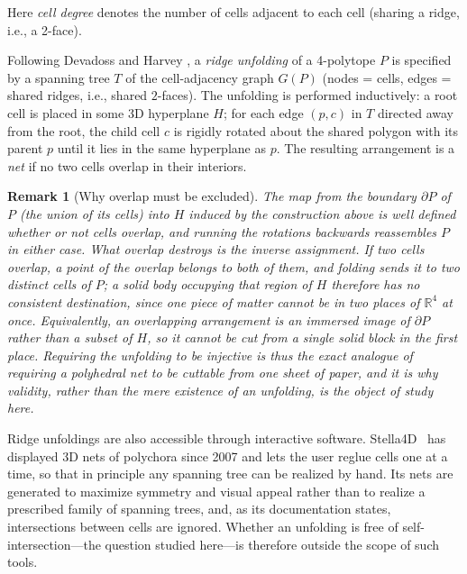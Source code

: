 \documentclass[11pt,letterpaper]{article}
\newtheorem{remark}{Remark}
\newcommand{\RR}{\mathbb{R}}
\begin{document}
\noindent
Here \emph{cell degree} denotes the number of cells adjacent to each
cell (sharing a ridge, i.e., a 2-face).


Following Devadoss and Harvey \cite{DevadossHarvey2022}, a \emph{ridge unfolding} of a
4-polytope $P$ is specified by a spanning tree $T$ of the
cell-adjacency graph $G(P)$ (nodes = cells, edges = shared
ridges, i.e., shared $2$-faces).
The unfolding is performed inductively: a root cell is placed in some
3D hyperplane $H$; for each edge $(p, c)$ in $T$ directed away from
the root, the child cell $c$ is rigidly rotated about the
shared polygon with its parent $p$ until it lies in the same
hyperplane as $p$.
The resulting arrangement is a \emph{net} if no two cells overlap in
their interiors.

\begin{remark}[Why overlap must be excluded]\label{rem:whyvalid}
The map from the boundary $\partial P$ of $P$ (the union of its cells)
into $H$ induced by the construction above is
well defined whether or not cells overlap, and running the rotations
backwards reassembles $P$ in either case.  What overlap destroys is the
\emph{inverse} assignment.  If two cells overlap, a point of the overlap
belongs to both of them, and folding sends it to two distinct cells of
$P$; a solid body occupying that region of $H$ therefore has no
consistent destination, since one piece of matter cannot be in two
places of $\RR^4$ at once.  Equivalently, an overlapping arrangement is
an immersed image of $\partial P$ rather than a subset of $H$, so it
cannot be cut from a single solid block in the first place.  Requiring
the unfolding to be injective is thus the exact analogue of requiring a
polyhedral net to be cuttable from one sheet of paper, and it is why
validity, rather than the mere existence of an unfolding, is the object
of study here.
\end{remark}

Ridge unfoldings are also accessible through interactive software.
Stella4D~\cite{Webb2026} has displayed 3D nets of polychora since
2007 and lets the user reglue cells one at a time, so that in
principle any spanning tree can be realized by hand.
Its nets are generated to maximize symmetry and visual appeal rather
than to realize a prescribed family of spanning trees, and, as its
documentation states, intersections between cells are ignored.
Whether an unfolding is free of self-intersection---the question
studied here---is therefore outside the scope of such tools.
\end{document}
